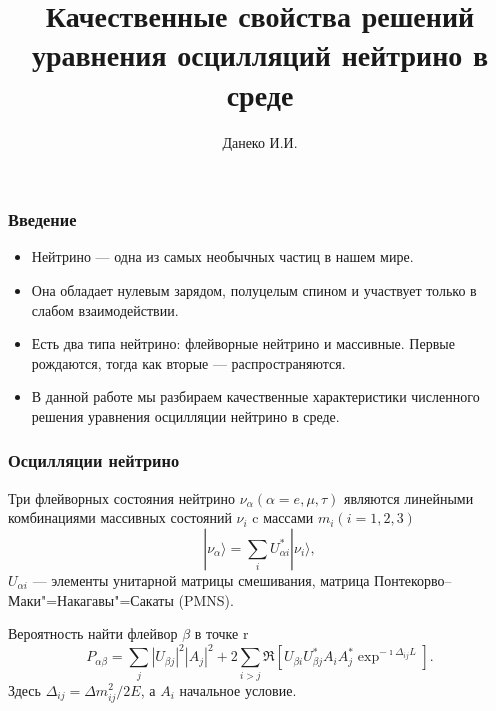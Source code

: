 \documentclass[utf8,9pt,mathserif,usepdftitle=false]{beamer}
\title{Качественные свойства решений уравнения осцилляций нейтрино в среде
}%
\author{Данеко И.И.}
\date[ИГУ, 2025]{%
  20 октября 2025\\%
  \vspace*{10ex}%
  \begin{flushright}
    \small
    Научный руководитель: Ломов В.П.\par
  \end{flushright}
  {\vspace*{7ex}
    \footnotesize%
    Иркутск, ФГБОУ ВО ИГУ\par%
  } }
\begin{document}
\begin{frame}
  \titlepage
\end{frame}

\begin{frame}
  \frametitle{Введение}%
  \begin{itemize}
  \item<1->
   Нейтрино — одна из самых необычных частиц в нашем мире.

   \item<2->
   Она обладает нулевым зарядом, полуцелым спином и участвует только в слабом
   взаимодействии.

  \item<3->
  Есть два типа нейтрино: флейворные нейтрино и
  массивные. Первые рождаются, тогда как вторые — распространяются.


  \item<4->%
   В данной работе мы разбираем качественные
  характеристики численного решения уравнения осцилляции нейтрино в среде.
  \end{itemize}
\end{frame}

\begin{frame}
  \frametitle{Осцилляции нейтрино}%
  Три флейворных состояния нейтрино \({\nu_{\alpha}}(\alpha= e, \mu, \tau)\)
  являются линейными комбинациями массивных состояний \({\nu_{i}}\) c массами
  \(m_{i}(i=1,2,3)\)
  \begin{equation*}\label{eq:1}
  	|{\nu_{\alpha}}\rangle=\sum_{i}U_{\alpha i}^{*}|{\nu_{i}}\rangle,
  \end{equation*}
  \(U_{\alpha i}\) — элементы унитарной матрицы
  смешивания, матрица Понтекорво–Маки"=Накагавы"=Сакаты (PMNS).

  Вероятность найти флейвор \(\beta\) в точке r
  \begin{equation*}
  	P_{\alpha\beta}=\sum_{j}|U_{\beta j}|^{2}|A_{j}|^{2}+
    2\sum_{i>j}\Re[U_{\beta
  	i}U_{\beta j}^{*}A_{i}A_{j}^{*}\exp^{-\imath\Delta_{ij}L}].
  \end{equation*}
  Здесь \(\Delta_{ij}=\Delta m_{ij}^2/2E\), а \(A_{i}\) начальное условие.
\end{frame}
\end{document}

